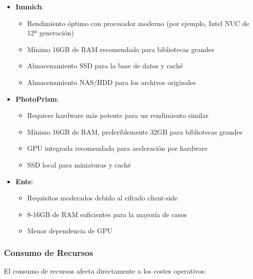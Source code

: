 \begin{itemize}
    \item \textbf{Immich}:
    \begin{itemize}
        \item Rendimiento óptimo con procesador moderno (por ejemplo, Intel NUC de 12ª generación)
        \item Mínimo 16GB de RAM recomendado para bibliotecas grandes
        \item Almacenamiento SSD para la base de datos y caché
        \item Almacenamiento NAS/HDD para los archivos originales
    \end{itemize}

    \item \textbf{PhotoPrism}:
    \begin{itemize}
        \item Requiere hardware más potente para un rendimiento similar
        \item Mínimo 16GB de RAM, preferiblemente 32GB para bibliotecas grandes
        \item GPU integrada recomendada para aceleración por hardware
        \item SSD local para miniaturas y caché
    \end{itemize}

    \item \textbf{Ente}:
    \begin{itemize}
        \item Requisitos moderados debido al cifrado client-side
        \item 8-16GB de RAM suficientes para la mayoría de casos
        \item Menor dependencia de GPU
    \end{itemize}
\end{itemize}

\subsubsection{Consumo de Recursos}

El consumo de recursos afecta directamente a los costes operativos:

